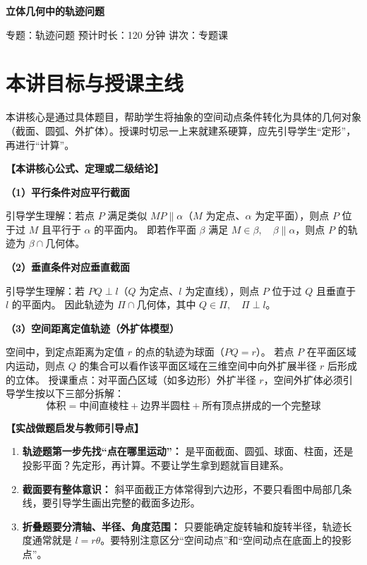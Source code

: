 \documentclass[11pt,a4paper]{ctexart}
\newcommand{\lessoninfo}[4]{%
  \begin{center}
    {\LARGE\bfseries #1}\par
    \vspace{0.8em}
    {\small 专题：#2 \quad 预计时长：#3 \quad 讲次：#4}
  \end{center}
  \vspace{0.6em}
}
\begin{document}
\lessoninfo{立体几何中的轨迹问题}{轨迹问题}{120 分钟}{专题课}

\section{本讲目标与授课主线}

本讲核心是通过具体题目，帮助学生将抽象的空间动点条件转化为具体的几何对象（截面、圆弧、外扩体）。授课时切忌一上来就建系硬算，应先引导学生“定形”，再进行“计算”。

\vspace{0.5em}
\noindent\textbf{【本讲核心公式、定理或二级结论】}

\textbf{（1）平行条件对应平行截面}

引导学生理解：若点 $P$ 满足类似 $MP\parallel \alpha$（$M$ 为定点、$\alpha$ 为定平面），则点 $P$ 位于过 $M$ 且平行于 $\alpha$ 的平面内。
即若作平面 $\beta$ 满足 $M\in\beta,\quad \beta\parallel\alpha$，则点 $P$ 的轨迹为 $\beta\cap \text{几何体}$。

\textbf{（2）垂直条件对应垂直截面}

引导学生理解：若 $PQ\perp l$（$Q$ 为定点、$l$ 为定直线），则点 $P$ 位于过 $Q$ 且垂直于 $l$ 的平面内。
因此轨迹为 $\Pi\cap \text{几何体}$，其中 $Q\in\Pi,\quad \Pi\perp l$。

\textbf{（3）空间距离定值轨迹（外扩体模型）}

空间中，到定点距离为定值 $r$ 的点的轨迹为球面（$PQ=r$）。
若点 $P$ 在平面区域内运动，则点 $Q$ 的集合可以看作该平面区域在三维空间中向外扩展半径 $r$ 后形成的立体。
授课重点：对平面凸区域（如多边形）外扩半径 $r$，空间外扩体必须引导学生按以下三部分拆解：
\[ \text{体积} = \text{中间直棱柱} + \text{边界半圆柱} + \text{所有顶点拼成的一个完整球} \]

\vspace{0.5em}
\noindent\textbf{【实战做题启发与教师引导点】}
\begin{enumerate}[itemsep=0.2em]
  \item \textbf{轨迹题第一步先找“点在哪里运动”：} 是平面截面、圆弧、球面、柱面，还是投影平面？先定形，再计算。不要让学生拿到题就盲目建系。
  \item \textbf{截面要有整体意识：} 斜平面截正方体常得到六边形，不要只看图中局部几条线，要引导学生画出完整的截面多边形。
  \item \textbf{折叠题要分清轴、半径、角度范围：} 只要能确定旋转轴和旋转半径，轨迹长度通常就是 $l = r\theta$。要特别注意区分“空间动点”和“空间动点在底面上的投影点”。
\end{enumerate}
\end{document}

